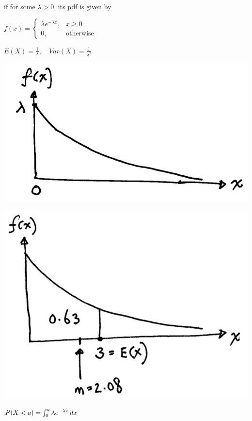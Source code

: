 \documentclass[10pt, landscape]{article}
\begin{document}
\begin{multicols*}{3}
  if for some $\lambda > 0$, its pdf is given by 

  \begin{tightcenter}
    $f(x) = \begin{cases} \lambda e^{-\lambda x}, &x \geq 0 \\ 0, &\text{otherwise} \end{cases}$

    $E(X) = \frac{1}{\lambda}, \quad Var(X) = \frac{1}{\lambda^2}$
  \end{tightcenter}

  \begin{minipage}[c]{0.3\linewidth}
    \includegraphics[width=0.95\linewidth]{st2131-exponential-rv.png}
  \end{minipage}
  \begin{minipage}[c]{0.3\linewidth}
    \includegraphics[width=0.95\linewidth]{st2131-exponential-rv-example.png} 
  \end{minipage}
  \begin{minipage}[c]{0.35\linewidth}
    $P(X < a) = \int^a_0 \lambda e^{-\lambda x} \mathop{dx}$
  \end{minipage}


\end{multicols*}
\end{document}
